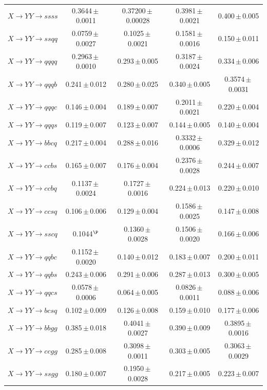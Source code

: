 \documentclass[12pt]{article}   %
\begin{document}
\begin{landscape}
{\begin{longtable}{@{\extracolsep{\fill}}lcccc@{}}
$X\to YY\to ssss$ & 0.3644\,$\pm$\,0.0011 & 0.37200\,$\pm$\,0.00028 & 0.3981\,$\pm$\,0.0021 & 0.400\,$\pm$\,0.005 \\
$X\to YY\to ssqq$ & 0.0759\,$\pm$\,0.0027 & 0.1025\,$\pm$\,0.0021 & 0.1581\,$\pm$\,0.0016 & 0.150\,$\pm$\,0.011 \\
$X\to YY\to qqqq$ & 0.2963\,$\pm$\,0.0010 & 0.293\,$\pm$\,0.005 & 0.3187\,$\pm$\,0.0024 & 0.334\,$\pm$\,0.006 \\
$X\to YY\to qqqb$ & 0.241\,$\pm$\,0.012 & 0.280\,$\pm$\,0.025 & 0.340\,$\pm$\,0.005 & 0.3574\,$\pm$\,0.0031 \\
$X\to YY\to qqqc$ & 0.146\,$\pm$\,0.004 & 0.189\,$\pm$\,0.007 & 0.2011\,$\pm$\,0.0021 & 0.220\,$\pm$\,0.004 \\
$X\to YY\to qqqs$ & 0.119\,$\pm$\,0.007 & 0.123\,$\pm$\,0.007 & 0.144\,$\pm$\,0.005 & 0.140\,$\pm$\,0.004 \\
$X\to YY\to bbcq$ & 0.217\,$\pm$\,0.004 & 0.288\,$\pm$\,0.016 & 0.3332\,$\pm$\,0.0006 & 0.329\,$\pm$\,0.012 \\
$X\to YY\to ccbs$ & 0.165\,$\pm$\,0.007 & 0.176\,$\pm$\,0.004 & 0.2376\,$\pm$\,0.0028 & 0.244\,$\pm$\,0.007 \\
$X\to YY\to ccbq$ & 0.1137\,$\pm$\,0.0024 & 0.1727\,$\pm$\,0.0016 & 0.224\,$\pm$\,0.013 & 0.220\,$\pm$\,0.010 \\
$X\to YY\to ccsq$ & 0.106\,$\pm$\,0.006 & 0.129\,$\pm$\,0.004 & 0.1586\,$\pm$\,0.0025 & 0.147\,$\pm$\,0.008 \\
$X\to YY\to sscq$ & 0.1044$^{\P}$ & 0.1360\,$\pm$\,0.0028 & 0.1506\,$\pm$\,0.0020 & 0.166\,$\pm$\,0.006 \\
$X\to YY\to qqbc$ & 0.1152\,$\pm$\,0.0020 & 0.140\,$\pm$\,0.012 & 0.183\,$\pm$\,0.007 & 0.200\,$\pm$\,0.011 \\
$X\to YY\to qqbs$ & 0.243\,$\pm$\,0.006 & 0.291\,$\pm$\,0.006 & 0.287\,$\pm$\,0.013 & 0.300\,$\pm$\,0.005 \\
$X\to YY\to qqcs$ & 0.0578\,$\pm$\,0.0006 & 0.064\,$\pm$\,0.005 & 0.0826\,$\pm$\,0.0011 & 0.088\,$\pm$\,0.006 \\
$X\to YY\to bcsq$ & 0.102\,$\pm$\,0.009 & 0.126\,$\pm$\,0.008 & 0.159\,$\pm$\,0.010 & 0.177\,$\pm$\,0.006 \\
$X\to YY\to bbgg$ & 0.385\,$\pm$\,0.018 & 0.4041\,$\pm$\,0.0027 & 0.390\,$\pm$\,0.009 & 0.3895\,$\pm$\,0.0016 \\
$X\to YY\to ccgg$ & 0.285\,$\pm$\,0.008 & 0.3098\,$\pm$\,0.0011 & 0.303\,$\pm$\,0.005 & 0.3063\,$\pm$\,0.0029 \\
$X\to YY\to ssgg$ & 0.180\,$\pm$\,0.007 & 0.1950\,$\pm$\,0.0028 & 0.217\,$\pm$\,0.005 & 0.223\,$\pm$\,0.007 \\

\end{longtable}}
\end{landscape}
\end{document}
